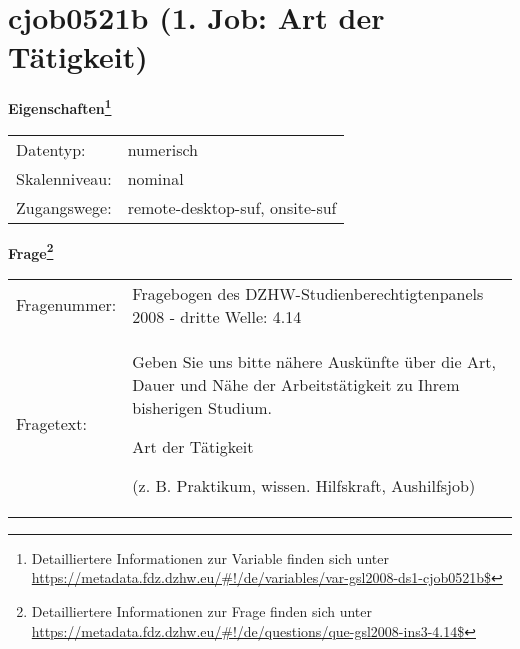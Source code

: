 
    \setcounter{footnote}{0}

    \vspace*{-1.8cm}
	\section{cjob0521b (1. Job: Art der Tätigkeit)}
	\label{section:cjob0521b}



    \vspace*{0.5cm}
    \noindent\textbf{Eigenschaften\footnote{Detailliertere Informationen zur Variable finden sich unter
		\url{https://metadata.fdz.dzhw.eu/\#!/de/variables/var-gsl2008-ds1-cjob0521b$}}}\\
	\begin{tabularx}{\hsize}{@{}lX}
	Datentyp: & numerisch \\
	Skalenniveau: & nominal \\
	Zugangswege: &
	  remote-desktop-suf, 
	  onsite-suf
 \\
    \end{tabularx}



				\vspace*{0.5cm}
                \noindent\textbf{Frage\footnote{Detailliertere Informationen zur Frage finden sich unter
		              \url{https://metadata.fdz.dzhw.eu/\#!/de/questions/que-gsl2008-ins3-4.14$}}}\\
				\begin{tabularx}{\hsize}{@{}lX}
					Fragenummer: &
					  Fragebogen des DZHW-Studienberechtigtenpanels 2008 - dritte Welle:
					  4.14
 \\
					Fragetext: & Geben Sie uns bitte nähere Auskünfte über die Art, Dauer und Nähe der Arbeitstätigkeit zu Ihrem bisherigen Studium.\par  Art der Tätigkeit\par  (z. B. Praktikum, wissen. Hilfskraft, Aushilfsjob) \\
				\end{tabularx}





